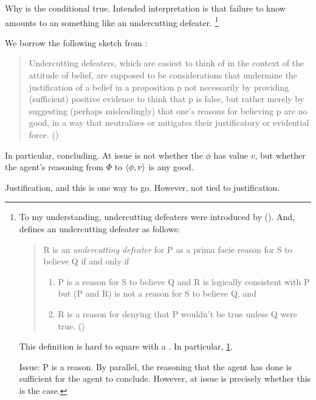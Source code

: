 \begin{note}
  Why is the conditional true.
  Intended interpretation is that failure to know \fc{} amounts to an something like an undercutting defeater.%
  \footnote{
    To my understanding, undercutting defeaters were introduced by \citeauthor{Pollock:1987un} (\citeyear{Pollock:1987un}).
    And, \citeauthor{Pollock:1987un} defines an undercutting defeater as follows:
    \begin{quote}
    R is an \emph{undercutting defeater} for P as a prima facie reason for S to believe Q if and only if
    \begin{enumerate}[label=(UD\arabic*), ref=(UD\arabic*)]
    \item
      \label{pollock:ud:1}
      P is a reason for S to believe Q and R is logically consistent with P but (P and R) is not a reason for S to believe Q, and
    \item
      \label{pollock:ud:2}
      R is a reason for denying that P wouldn't be true unless Q were true.%
      \mbox{}\hfill\mbox{(\citeyear[485]{Pollock:1987un})}
    \end{enumerate}
  \end{quote}
  This definition is hard to square with a \requ{}.
  In particular, \ref{pollock:ud:1}.

  Issue: P is a reason.
  By parallel, the reasoning that the agent has done is sufficient for the agent to conclude.
  However, at issue is precisely whether this is the case.

  }

  We borrow the following sketch from \textcite{Worsnip:2018aa}:
  \begin{quote}
    Undercutting defeaters, which are easiest to think of in the context of the attitude of belief, are supposed to be considerations that undermine the justification of a belief in a proposition p not necessarily by providing (sufficient) positive evidence to think that p is false, but rather merely by suggesting (perhaps misleadingly) that one’s reasons for believing p are no good, in a way that neutralizes or mitigates their justificatory or evidential force.%
    \mbox{}\hfill\mbox{(\citeyear[29]{Worsnip:2018aa})}
  \end{quote}

  In particular, concluding.
  At issue is not whether the \(\phi\) has value \(v\), but whether the agent's reasoning from \(\Phi\) to \(\langle \phi, v \rangle\) is any good.

  Justification, and this is one way to go.
  However, not tied to justification.
\end{note}

